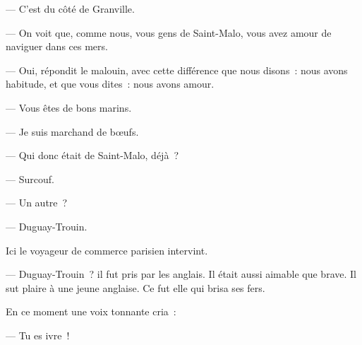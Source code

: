 \documentclass[french,twoside]{book} %
\begin{document}
— C’est du côté de Granville.\par
— On voit que, comme nous, vous gens de Saint-Malo, vous avez amour de naviguer dans ces mers.\par
— Oui, répondit le malouin, avec cette différence que nous disons : nous avons habitude, et que vous dites : nous avons amour.\par
— Vous êtes de bons marins.\par
— Je suis marchand de bœufs.\par
— Qui donc était de Saint-Malo, déjà ?\par
— Surcouf.\par
— Un autre ?\par
— Duguay-Trouin.\par
Ici le voyageur de commerce parisien intervint.\par
— Duguay-Trouin ? il fut pris par les anglais. Il était aussi aimable que brave. Il sut plaire à une jeune anglaise. Ce fut elle qui brisa ses fers.\par
En ce moment une voix tonnante cria :\par
— Tu es ivre !
\end{document}
